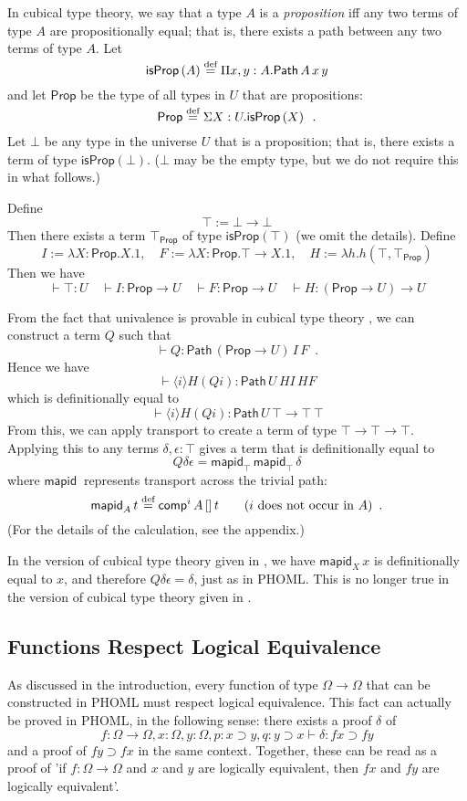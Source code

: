 \documentclass[a4paper,UKenglish]{lipics-v2016}
\newcommand*{\eqdef}{\mathrel{\smash{\stackrel{\text{def}}{=}}}}
\newcommand{\Path}[3]{\ensuremath{\mathsf{Path} \, {#1} \, {#2} \, {#3}}}
\newcommand{\Prop}{\mathsf{Prop}}
\newcommand{\isProp}[1]{\mathsf{isProp} \left( {#1} \right)}
\newcommand{\mapid}[2]{\mathsf{mapid}_{#1} \, {#2}}
\newcommand{\comp}{\mathsf{comp}}
\theoremstyle{plain}
\theoremstyle{definition}
\begin{document}
In cubical type theory, we say that a type $A$ is a \emph{proposition} iff any two terms of type $A$ are propositionally equal; that is, there exists a path between any two terms of type $A$.  Let
$$ \isProp{A} \eqdef \Pi x,y:A. \Path{A}{x}{y} $$
and let $\Prop$ be the type of all types in $U$ that are propositions:
$$ \Prop \eqdef \Sigma X : U. \isProp{X} \enspace . $$
Let $\bot$ be any type in the universe $U$ that is a proposition; that is, there exists a term of type $\isProp{\bot}$.  ($\bot$ may be the empty type, but we do not require this in what follows.)

Define
$$ \top := \bot \rightarrow \bot $$
Then there exists a term $\top_\Prop$ of type $\isProp{\top}$ (we omit the details).  Define
$$ I := \lambda X:\Prop.X.1, \quad F := \lambda X : \Prop.\top \rightarrow X.1, \quad H := \lambda h.h (\top , \top_\Prop) $$
Then we have
$$ \vdash \top : U \quad
\vdash I  : \Prop \rightarrow U \quad
\vdash F  : \Prop \rightarrow U \quad
\vdash H  : (\Prop \rightarrow U) \rightarrow U $$

From the fact that univalence is provable in cubical type theory \cite{cchm:cubical}, we can construct a term $Q$ such that
$$ \vdash Q : \Path{(\Prop \rightarrow U)}{I}{F} \enspace . $$
Hence we have
$$ \vdash \langle i \rangle H (Q i) : \Path{U}{HI}{HF} $$
which is definitionally equal to
$$ \vdash \langle i \rangle H (Q i) : \Path{U}{\top \rightarrow \top}{\top} $$
From this, we can apply transport to create a term of type $\top \rightarrow \top \rightarrow \top$.  Applying this to any terms $\delta, \epsilon : \top$ gives a term that
is definitionally equal to
$$ Q \delta \epsilon = \mapid{\top}{\mapid{\top}{\delta}} $$
where $\mapid{}{}$ represents transport across the trivial path:
$$ \mapid{A}{t} \eqdef \comp^i \, A \, [] \, t \qquad (i \text{ does not occur in } A) \enspace . $$
(For the details of the calculation, see the appendix.)

In the version of cubical type theory given in \cite{bch:cubical}, we have $\mapid{X}{x}$ is definitionally equal to $x$, and therefore $Q \delta \epsilon = \delta$, just as in PHOML.
This is no longer true in the version of cubical type theory given in \cite{cchm:cubical}.

\subsection{Functions Respect Logical Equivalence}
\label{section:exampletwo}

As discussed in the introduction, every function of type $\Omega \rightarrow \Omega$ that can be constructed in PHOML must respect logical equivalence.  This fact can actually be proved in PHOML,
in the following sense: there exists a proof $\delta$ of
$$ f : \Omega \rightarrow \Omega, x : \Omega, y : \Omega, p : x \supset y, q : y \supset x \vdash \delta : f x \supset f y $$
and a proof of $f y \supset f x$ in the same context.  Together, these can be read as a proof of 'if $f : \Omega \rightarrow \Omega$ and $x$ and $y$ are logically equivalent, then $fx$ and $fy$ are logically equivalent'.
\end{document}
